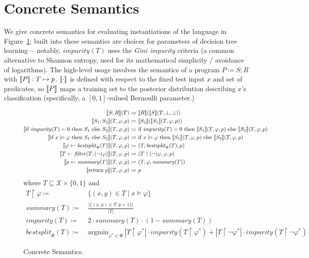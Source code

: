 \section{Concrete Semantics}

We give concrete semantics for evaluating instantiations of the language
in Figure~\ref{fig:concrete};
built into these semantics are choices for parameters of decision tree learning---%
notably, $\mathit{impurity(T)}$ uses the \emph{Gini impurity} criteria
(a common alternative to Shannon entropy, used for its mathematical simplicity
/ avoidance of logarithms).
The high-level usage involves the semantics of a program $P \coloneqq S ; R$
with $\llbracket {P} \rrbracket : T \mapsto p$.
$\llbracket {\cdot} \rrbracket$ is defined with respect to the fixed test input $x$ and set of predicates,
so $\llbracket {P} \rrbracket$ maps a training set to the posterior distribution describing $x$'s classification
(specifically, a $[0,1]$-valued Bernoulli parameter.)


\begin{figure}
\centering
\begin{align*}
\den{S ; R}(T) \coloneqq&~ \den{R}(\den{S}(T, \bot, \bot)) \\
%
\den{S_1 ; S_2}(T, \varphi, p) \coloneqq&~ \den{S_2}(\den{S_1}(T, \varphi, p)) \\
%
\den{\iteimpuritynode{S_1}{S_2}}(T, \varphi, p) \coloneqq&~
\text{if } \mathit{impurity}(T) = 0 \text{ then } \den{S_1}(T, \varphi, p)
\text{ else } \den{S_2}(T, \varphi, p) \\
%
\den{\itemodelsnode{S_1}{S_2}}(T, \varphi, p) \coloneqq&~
\text{if } x \models \varphi \text{ then } \den{S_1}(T, \varphi, p)
\text{ else } \den{S_2}(T, \varphi, p) \\
%
\den{\bestsplitnode}(T, \varphi, p) \coloneqq&~
(T, \mathit{bestsplit}_\Phi(T), p) \\
%
\den{\filternode[(\lnot)]}(T, \varphi, p) \coloneqq&~
(T \upharpoonright (\lnot)\varphi, \varphi, p) \\
%
\den{\summarynode}(T, \varphi, p) \coloneqq&~ (T, \varphi, \mathit{summary}(T)) \\
%
\den{\returnnode}(T, \varphi, p) \coloneqq&~ p
\end{align*}
where $T \subseteq \mathcal{X} \times \{0,1\}$ and
\begin{align*}
T \upharpoonright \varphi \coloneqq&~ \{(x,y) \in T \mid x \models \varphi\} \\
\mathit{summary}(T) \coloneqq&~ \frac{|\{(x,y) \in T : y = 1\}|}{|T|} \\
\mathit{impurity}(T) \coloneqq&~ 2 \cdot \mathit{summary}(T) \cdot (1-\mathit{summary}(T)) \\
\mathit{bestsplit}_\Phi(T) \coloneqq&~ \text{argmin}_{\varphi^* \in \Phi}~
|T \upharpoonright \varphi^*| \cdot \mathit{impurity}(T \upharpoonright \varphi^*) +
|T \upharpoonright \lnot\varphi^*| \cdot \mathit{impurity}(T \upharpoonright \lnot\varphi^*)
\end{align*}
\caption{Concrete Semantics.}
\label{fig:concrete}
\end{figure}

